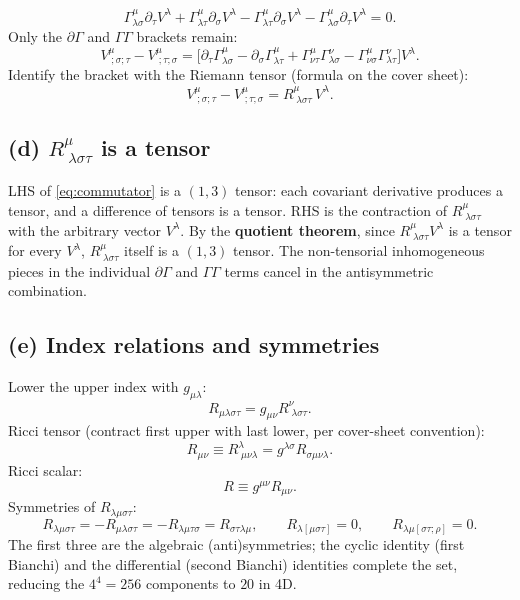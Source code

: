 \documentclass[11pt]{article}
\begin{document}
\[ \Gamma^\mu_{\lambda\sigma}\partial_\tau V^\lambda + \Gamma^\mu_{\lambda\tau}\partial_\sigma V^\lambda - \Gamma^\mu_{\lambda\tau}\partial_\sigma V^\lambda - \Gamma^\mu_{\lambda\sigma}\partial_\tau V^\lambda = 0. \]
Only the $\partial\Gamma$ and $\Gamma\Gamma$ brackets remain:
\[ V^\mu_{\;;\sigma;\tau} - V^\mu_{\;;\tau;\sigma} = \bigl[\partial_\tau \Gamma^\mu_{\lambda\sigma} - \partial_\sigma \Gamma^\mu_{\lambda\tau} + \Gamma^\mu_{\nu\tau}\Gamma^\nu_{\lambda\sigma} - \Gamma^\mu_{\nu\sigma}\Gamma^\nu_{\lambda\tau}\bigr] V^\lambda. \]
Identify the bracket with the Riemann tensor (formula on the cover sheet):
\begin{equation}
\boxed{\;V^\mu_{\;;\sigma;\tau} - V^\mu_{\;;\tau;\sigma} = R^\mu_{\;\lambda\sigma\tau}\,V^\lambda.\;}
\label{eq:commutator}
\end{equation}

\subsection*{(d) $R^\mu_{\;\lambda\sigma\tau}$ is a tensor}

LHS of \eqref{eq:commutator} is a $(1,3)$ tensor: each covariant derivative produces a tensor, and a difference of tensors is a tensor. RHS is the contraction of $R^\mu_{\;\lambda\sigma\tau}$ with the arbitrary vector $V^\lambda$. By the \textbf{quotient theorem}, since $R^\mu_{\;\lambda\sigma\tau}V^\lambda$ is a tensor for every $V^\lambda$, $R^\mu_{\;\lambda\sigma\tau}$ itself is a $(1,3)$ tensor. The non-tensorial inhomogeneous pieces in the individual $\partial\Gamma$ and $\Gamma\Gamma$ terms cancel in the antisymmetric combination.

\subsection*{(e) Index relations and symmetries}

Lower the upper index with $g_{\mu\lambda}$:
\[ R_{\mu\lambda\sigma\tau} = g_{\mu\nu} R^\nu_{\;\lambda\sigma\tau}. \]
Ricci tensor (contract first upper with last lower, per cover-sheet convention):
\[ R_{\mu\nu} \equiv R^\lambda_{\;\mu\nu\lambda} = g^{\lambda\sigma} R_{\sigma\mu\nu\lambda}. \]
Ricci scalar:
\[ R \equiv g^{\mu\nu} R_{\mu\nu}. \]
Symmetries of $R_{\lambda\mu\sigma\tau}$:
\[ \boxed{\;R_{\lambda\mu\sigma\tau} = -R_{\mu\lambda\sigma\tau} = -R_{\lambda\mu\tau\sigma} = R_{\sigma\tau\lambda\mu},\qquad R_{\lambda[\mu\sigma\tau]}=0,\qquad R_{\lambda\mu[\sigma\tau;\rho]}=0.\;} \]
The first three are the algebraic (anti)symmetries; the cyclic identity (first Bianchi) and the differential (second Bianchi) identities complete the set, reducing the $4^4=256$ components to $20$ in 4D.
\end{document}
